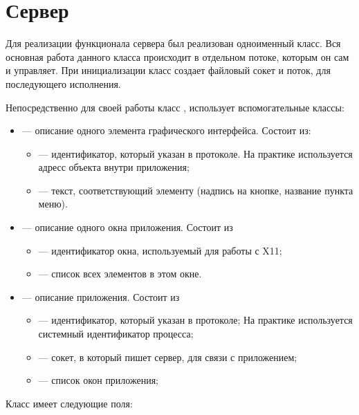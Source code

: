 \section{Сервер}

Для реализации функционала сервера был реализован одноименный класс. Вся
основная работа данного класса происходит в отдельном потоке, которым он сам и
управляет. При инициализации класс создает файловый сокет и поток, для
последующего исполнения.

Непосредственно для своей работы класс , использует вспомогательные
классы:
\begin{itemize}
    \item {} — описание одного элемента графического интерфейса.
        Состоит из:
        \begin{itemize}
            \item {} — идентификатор, который указан в протоколе. На
                практике используется адресс объекта внутри приложения;
            \item {} — текст, соответствующий элементу (надпись на
                кнопке, название пункта меню).
        \end{itemize}

    \item {} — описание одного окна приложения. Состоит из
        \begin{itemize}
        \item {} — идентификатор окна, используемый для работы с X11;
        \item {} — список всех элементов в этом окне.
        \end{itemize}

    \item {} — описание приложения. Состоит из
        \begin{itemize}
        \item {} — идентификатор, который указан в протоколе; На
            практике используется системный идентификатор процесса;
        \item {} — сокет, в который пишет сервер, для связи с
            приложением;
        \item {} — список окон приложения;
        \end{itemize}
\end{itemize}

Класс  имеет следующие поля:

